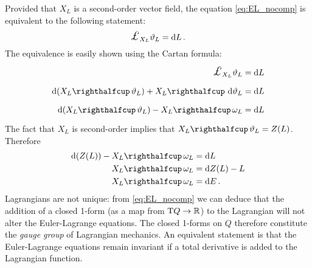 Provided that \(X_L\) is a second-order vector field, the equation \cref{eq:EL_nocomp} is equivalent to the following statement:
\begin{equation}
    \lied{X_L}{\theta_L} = \dd{L}.
\end{equation}
The equivalence is easily shown using the Cartan formula:
\begin{equation*}
    \begin{split}
        \lied{X_L}{\theta_L} &= \dd{L} \\
        \dd{\qty(\intpr{X_L}{\theta_L})} + \intpr{X_L}{\dd{\theta_L}} &= \dd{L} \\
        \dd{\qty(\intpr{X_L}{\theta_L})} - \intpr{X_L}{\omega_L} &= \dd{L}
    \end{split}
\end{equation*}
The fact that \(X_L\) is second-order implies that \(\intpr{X_L}{\theta_L} = Z(L)\). Therefore 
\begin{equation*}
    \begin{split}
        \dd{(Z(L))} - \intpr{X_L}{\omega_L} &= \dd{L} \\
        \intpr{X_L}{\omega_L} &= \dd{Z(L) - L} \\
        \intpr{X_L}{\omega_L} &= \dd{E}.
    \end{split}
\end{equation*}
Lagrangians are not unique: from \cref{eq:EL_nocomp} we can deduce that the addition of a closed 1-form (as a map from \(\mathrm{T}Q \to \mathbb{R}\)) to the Lagrangian will not alter the Euler-Lagrange equations. The closed 1-forms on \(Q\)  therefore constitute the \emph{gauge group} of Lagrangian mechanics. An equivalent statement is that the Euler-Lagrange equations remain invariant if a total derivative is added to the Lagrangian function. \cite{Abraham1978}
